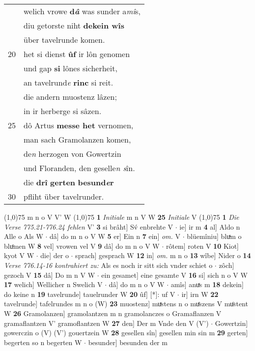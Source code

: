 \documentclass[8pt,a4paper,notitlepage]{article}
\begin{document}
\begin{table}[ht]
\begin{minipage}[t]{0.5\linewidth}
\begin{tabular}{rl}
 & welich vrowe \textbf{d\textit{â}} was sunder a\textit{mî}s,\\ 
 & diu getorste niht \textbf{dekein wîs}\\ 
 & über tavelrunde komen.\\ 
20 & het si dienst \textbf{ûf} ir lôn genomen\\ 
 & und gap \textbf{si} lônes sicherheit,\\ 
 & an tavelrund\textit{e} \textbf{rinc} si reit.\\ 
 & die andern muostenz lâzen;\\ 
 & in ir herberge si sâzen.\\ 
25 & dô Artus \textbf{messe het} vernomen,\\ 
 & man sach Gramolanzen komen,\\ 
 & de\textit{n} herzogen von Gowertzin\\ 
 & und Floranden, den geselle\textit{n s}în.\\ 
 & die \textbf{drî} \textbf{gerten} \textbf{besund\textit{e}r}\\ 
30 & pfliht über tavelrunder.\\ 
\end{tabular}
\scriptsize
\line(1,0){75} \newline
m n o V V' W \newline
\line(1,0){75} \newline
\textbf{1} \textit{Initiale} m n V W  \textbf{25} \textit{Initiale} V  \newline
\line(1,0){75} \newline
\textbf{1} \textit{Die Verse 775.21-776.24 fehlen} V'  \textbf{3} si brâht] Sv́ enbrehte V  $\cdot$ ie] ir m \textbf{4} al] Aldo n Alle o Als W  $\cdot$ dâ] do m n o V W \textbf{5} er] Ein n \textbf{7} ein] \textit{om.} V  $\cdot$ blüemîniu] bluͯm o bluͦmen W \textbf{8} vel] vrowen vel V \textbf{9} dâ] do m n o V W  $\cdot$ rôtem] roten V \textbf{10} Kiot] kyot V W  $\cdot$ die] der o  $\cdot$ sprach] gesprach W \textbf{12} in] \textit{om.} m n o \textbf{13} wîbe] Nider o \textbf{14} \textit{Verse 776.14-16 kontrahiert zu:} Als es noch ir sitt sich vnder schiet o   $\cdot$ zôch] gezoch V \textbf{15} dâ] Do m n V W  $\cdot$ ein gesamet] eine gesamte V \textbf{16} si] sich n o V W \textbf{17} welich] Wellicher n Swelich V  $\cdot$ dâ] do m n o V W  $\cdot$ amîs] anuͯs m \textbf{18} dekein] do keine n \textbf{19} tavelrunde] tauelrunder W \textbf{20} ûf] [*]: uf V  $\cdot$ ir] irn W \textbf{22} tavelrunde] tafelrundes m n o (W) \textbf{23} muostenz] muͯstens n o muͤszens V muͦstent W \textbf{26} Gramolanzen] gramolantzen m n gramolanczes o Gramaflanzen V gramaflantzen V' gramoflantzen W \textbf{27} den] Der m Vnde den V (V')  $\cdot$ Gowertzin] gowerczin o (V) (V') gouertzein W \textbf{28} gesellen sîn] gesellen min sin m \textbf{29} gerten] begerten so n begerten W  $\cdot$ besunder] besunden der m \newline
\end{minipage}
\end{table}
\end{document}
